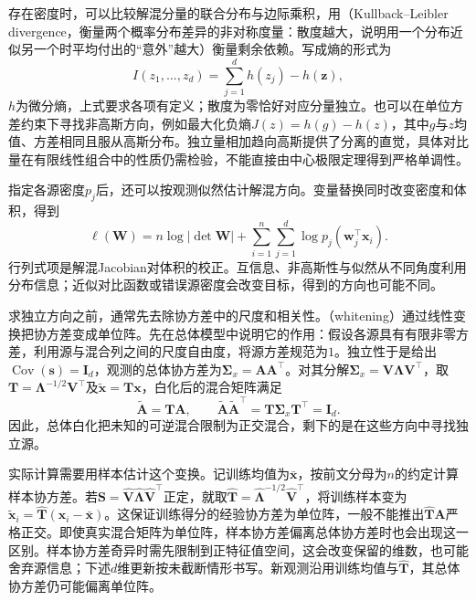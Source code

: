 存在密度时，可以比较解混分量的联合分布与边际乘积，用（Kullback--Leibler divergence，衡量两个概率分布差异的非对称度量：散度越大，说明用一个分布近似另一个时平均付出的“意外”越大）衡量剩余依赖。写成熵的形式为
\[
  I(z_1,\ldots,z_d)
  =\sum_{j=1}^{d}h(z_j)-h(\bm{z}),
\]
$h$为微分熵，上式要求各项有定义；散度为零恰好对应分量独立。也可以在单位方差约束下寻找非高斯方向，例如最大化负熵$J(z)=h(g)-h(z)$，其中$g$与$z$均值、方差相同且服从高斯分布。独立量相加趋向高斯提供了分离的直觉，具体对比量在有限线性组合中的性质仍需检验，不能直接由中心极限定理得到严格单调性。

指定各源密度$p_j$后，还可以按观测似然估计解混方向。变量替换同时改变密度和体积，得到
\begin{equation}
  \ell(\bm{W})
  =n\log|\det\bm{W}|
   +\sum_{i=1}^{n}\sum_{j=1}^{d}
        \log p_j(\bm{w}_j^{\top}\bm{x}_i).
  \label{eq:dim-ica-likelihood}
\end{equation}
行列式项是解混Jacobian对体积的校正。互信息、非高斯性与似然从不同角度利用分布信息；近似对比函数或错误源密度会改变目标，得到的方向也可能不同。

求独立方向之前，通常先去除协方差中的尺度和相关性。（whitening）通过线性变换把协方差变成单位阵。先在总体模型中说明它的作用：假设各源具有有限非零方差，利用源与混合列之间的尺度自由度，将源方差规范为$1$。独立性于是给出$\operatorname{Cov}(\bm{s})=\bm{I}_d$，观测的总体协方差为$\bm{\Sigma}_x=\bm{A}\bm{A}^{\top}$。对其分解$\bm{\Sigma}_x=\bm{V}\bm{\Lambda}\bm{V}^{\top}$，取$\bm{T}=\bm{\Lambda}^{-1/2}\bm{V}^{\top}$及$\widetilde{\bm{x}}=\bm{T}\bm{x}$，白化后的混合矩阵满足
\begin{equation}
  \widetilde{\bm{A}}=\bm{T}\bm{A},\qquad
  \widetilde{\bm{A}}\widetilde{\bm{A}}^{\top}
    =\bm{T}\bm{\Sigma}_x\bm{T}^{\top}=\bm{I}_d.
  \label{eq:dim-ica-population-whitening}
\end{equation}
因此，总体白化把未知的可逆混合限制为正交混合，剩下的是在这些方向中寻找独立源。

实际计算需要用样本估计这个变换。记训练均值为$\bar{\bm{x}}$，按前文分母为$n$的约定计算样本协方差。若$\bm{S}=\widehat{\bm{V}}\widehat{\bm{\Lambda}}\widehat{\bm{V}}^{\top}$正定，就取$\widehat{\bm{T}}=\widehat{\bm{\Lambda}}^{-1/2}\widehat{\bm{V}}^{\top}$，将训练样本变为$\widetilde{\bm{x}}_i=\widehat{\bm{T}}(\bm{x}_i-\bar{\bm{x}})$。这保证训练得分的经验协方差为单位阵，一般不能推出$\widehat{\bm{T}}\bm{A}$严格正交。即使真实混合矩阵为单位阵，样本协方差偏离总体协方差时也会出现这一区别。样本协方差奇异时需先限制到正特征值空间，这会改变保留的维数，也可能舍弃源信息；下述$d$维更新按未截断情形书写。新观测沿用训练均值与$\widehat{\bm{T}}$，其总体协方差仍可能偏离单位阵。

